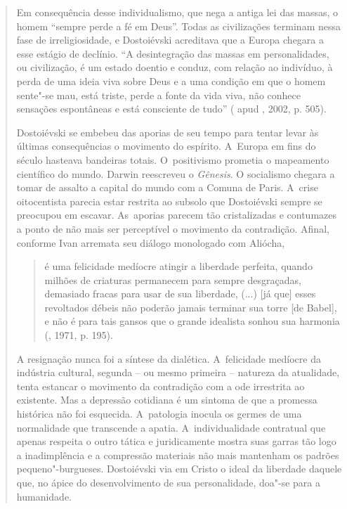 {\begin{quote}
Em consequência desse individualismo, que nega a antiga lei das massas,
o homem ``sempre perde a fé em Deus''. Todas as civilizações terminam
nessa fase de irreligiosidade, e Dostoiévski acreditava que a Europa
chegara a esse estágio de declínio. ``A desintegração das massas em
personalidades, ou civilização, é um estado doentio e conduz, com
relação ao indivíduo, à perda de uma ideia viva sobre Deus e a uma
condição em que o homem sente"-se mau, está triste, perde a fonte da vida
viva, não conhece sensações espontâneas e está consciente de tudo''
( apud , 2002, p. 505).

Dostoiévski se embebeu das aporias de seu tempo para tentar levar às
últimas consequências o movimento do espírito. A~Europa em fins do
século  hasteava bandeiras totais. O~positivismo prometia o
mapeamento científico do mundo. Darwin reescreveu o \emph{Gênesis}. O
socialismo chegara a tomar de assalto a capital do mundo com a Comuna de
Paris. A~crise oitocentista parecia estar restrita ao subsolo que
Dostoiévski sempre se preocupou em escavar. As~aporias parecem tão
cristalizadas e contumazes a ponto de não mais ser perceptível o
movimento da contradição. Afinal, conforme Ivan arremata seu diálogo
monologado com Aliócha,

\begin{quote}
é uma felicidade medíocre atingir a liberdade perfeita, quando milhões
de criaturas permanecem para sempre desgraçadas, demasiado fracas para
usar de sua liberdade, (...) {[}já que{]} esses revoltados débeis não
poderão jamais terminar sua torre {[}de Babel{]}, e não é para tais
gansos que o grande idealista sonhou sua harmonia (, 1971, p.
195).
\end{quote}

A resignação nunca foi a síntese da dialética. A~felicidade medíocre da
indústria cultural, segunda -- ou mesmo primeira -- natureza da
atualidade, tenta estancar o movimento da contradição com a ode
irrestrita ao existente. Mas a depressão cotidiana é um sintoma de que a
promessa histórica não foi esquecida. A~patologia inocula os germes de
uma normalidade que transcende a apatia. A~individualidade contratual
que apenas respeita o outro tática e juridicamente mostra suas garras
tão logo a inadimplência e a compressão materiais não mais mantenham os
padrões pequeno"-burgueses. Dostoiévski via em Cristo o ideal da
liberdade daquele que, no ápice do desenvolvimento de sua personalidade,
doa"-se para a humanidade.


\end{quote}}
